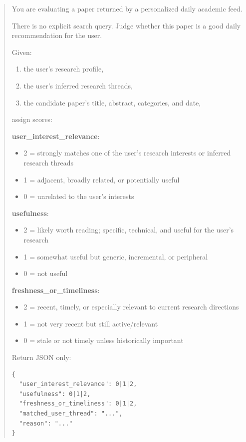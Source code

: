 \documentclass[11pt]{article}
\begin{document}
\begin{quote}
You are evaluating a paper returned by a personalized daily academic feed.

There is no explicit search query. Judge whether this paper is a good daily recommendation for the user.

Given:
\begin{enumerate}
    \item the user's research profile,
    \item the user's inferred research threads,
    \item the candidate paper's title, abstract, categories, and date,
\end{enumerate}

assign scores:

\textbf{user\_interest\_relevance}:
\begin{itemize}
    \item 2 = strongly matches one of the user's research interests or inferred research threads
    \item 1 = adjacent, broadly related, or potentially useful
    \item 0 = unrelated to the user's interests
\end{itemize}

\textbf{usefulness}:
\begin{itemize}
    \item 2 = likely worth reading; specific, technical, and useful for the user's research
    \item 1 = somewhat useful but generic, incremental, or peripheral
    \item 0 = not useful
\end{itemize}

\textbf{freshness\_or\_timeliness}:
\begin{itemize}
    \item 2 = recent, timely, or especially relevant to current research directions
    \item 1 = not very recent but still active/relevant
    \item 0 = stale or not timely unless historically important
\end{itemize}

Return JSON only:

\begin{verbatim}
{
  "user_interest_relevance": 0|1|2,
  "usefulness": 0|1|2,
  "freshness_or_timeliness": 0|1|2,
  "matched_user_thread": "...",
  "reason": "..."
}
\end{verbatim}
\end{quote}
\end{document}

